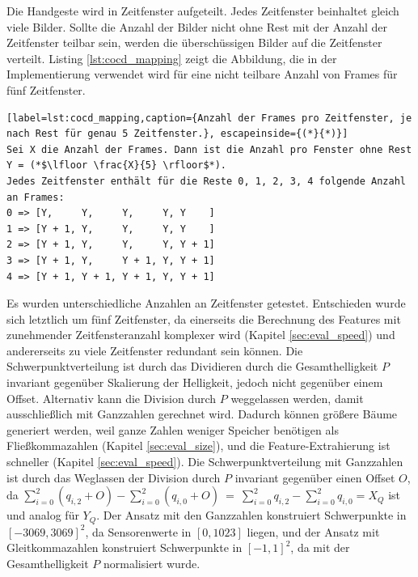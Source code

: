 Die Handgeste wird in Zeitfenster aufgeteilt. Jedes Zeitfenster beinhaltet gleich viele Bilder. Sollte die Anzahl der Bilder nicht ohne Rest mit der Anzahl der Zeitfenster teilbar sein, werden die
überschüssigen Bilder auf die Zeitfenster verteilt. Listing \ref{lst:cocd_mapping} zeigt die Abbildung, die in der Implementierung verwendet wird für eine nicht teilbare Anzahl von Frames für
fünf Zeitfenster.
\begin{lstlisting}[label=lst:cocd_mapping,caption={Anzahl der Frames pro Zeitfenster, je nach Rest für genau 5 Zeitfenster.}, escapeinside={(*}{*)}]
Sei X die Anzahl der Frames. Dann ist die Anzahl pro Fenster ohne Rest Y = (*$\lfloor \frac{X}{5} \rfloor$*).
Jedes Zeitfenster enthält für die Reste 0, 1, 2, 3, 4 folgende Anzahl an Frames:
0 => [Y,     Y,     Y,     Y, Y    ]
1 => [Y + 1, Y,     Y,     Y, Y    ]
2 => [Y + 1, Y,     Y,     Y, Y + 1]
3 => [Y + 1, Y,     Y + 1, Y, Y + 1]
4 => [Y + 1, Y + 1, Y + 1, Y, Y + 1]
\end{lstlisting}
Es wurden unterschiedliche Anzahlen an Zeitfenster getestet. Entschieden wurde sich letztlich um fünf Zeitfenster, da einerseits die Berechnung des Features mit zunehmender Zeitfensteranzahl komplexer wird
(Kapitel \ref{sec:eval_speed}) und andererseits zu viele Zeitfenster redundant sein können.
\newline
\newline
Die Schwerpunktverteilung ist durch das Dividieren durch die Gesamthelligkeit $P$ invariant gegenüber Skalierung der Helligkeit, jedoch nicht gegenüber einem Offset. Alternativ kann
die Division durch $P$ weggelassen werden, damit ausschließlich mit Ganzzahlen gerechnet wird. Dadurch können größere Bäume generiert werden, weil ganze Zahlen weniger Speicher benötigen als Fließkommazahlen
(Kapitel \ref{sec:eval_size}), und die Feature-Extrahierung ist schneller (Kapitel \ref{sec:eval_speed}). Die Schwerpunktverteilung
mit Ganzzahlen ist durch das Weglassen der Division durch $P$ invariant gegenüber einen Offset $O$, da $\sum_{i=0}^{2}(q_{i,2} + O) - \sum_{i=0}^{2}(q_{i,0} + O)\ =\ \sum_{i=0}^{2} q_{i,2} - \sum_{i=0}^{2} q_{i,0} = X_Q$
ist und analog für $Y_Q$. Der Ansatz mit den Ganzzahlen konstruiert Schwerpunkte in $[-3069, 3069]^2$, da Sensorenwerte in $[0, 1023]$ liegen, und der Ansatz mit Gleitkommazahlen konstruiert
Schwerpunkte in $[-1, 1]^2$, da mit der Gesamthelligkeit $P$ normalisiert wurde.
